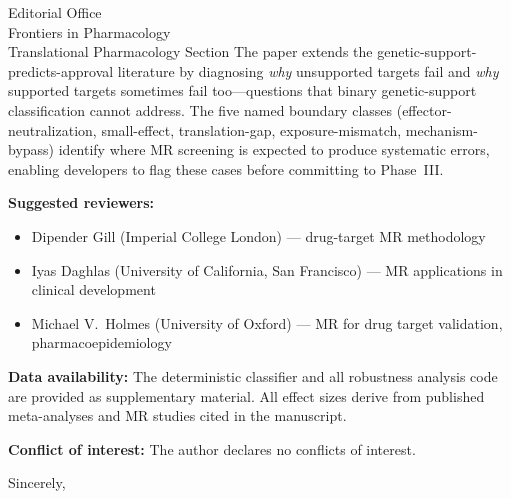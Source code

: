 \documentclass[11pt]{letter}
\begin{document}
\begin{letter}{Editorial Office \\ Frontiers in Pharmacology \\ Translational Pharmacology Section}
The paper extends the genetic-support-predicts-approval literature by diagnosing \emph{why} unsupported targets fail and \emph{why} supported targets sometimes fail too---questions that binary genetic-support classification cannot address. The five named boundary classes (effector-neutralization, small-effect, translation-gap, exposure-mismatch, mechanism-bypass) identify where MR screening is expected to produce systematic errors, enabling developers to flag these cases before committing to Phase~III.

\textbf{Suggested reviewers:}
\begin{itemize}
\item Dipender Gill (Imperial College London) --- drug-target MR methodology
\item Iyas Daghlas (University of California, San Francisco) --- MR applications in clinical development
\item Michael V.\ Holmes (University of Oxford) --- MR for drug target validation, pharmacoepidemiology
\end{itemize}

\textbf{Data availability:} The deterministic classifier and all robustness analysis code are provided as supplementary material. All effect sizes derive from published meta-analyses and MR studies cited in the manuscript.

\textbf{Conflict of interest:} The author declares no conflicts of interest.

\closing{Sincerely,}

\end{letter}
\end{document}
